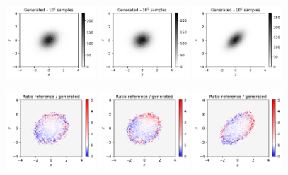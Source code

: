 \documentclass[twocolumn,preprintnumbers,superscriptaddress]{revtex4-2}
\begin{document}
\begin{figure}
  \includegraphics[width=0.3\textwidth]{plots/3Dgaussian_posdef/1-2_FAKE_100k.pdf}%
  \includegraphics[width=0.3\textwidth]{plots/3Dgaussian_posdef/2-3_FAKE_100k.pdf}%
  \includegraphics[width=0.3\textwidth]{plots/3Dgaussian_posdef/3-1_FAKE_100k.pdf}

  \includegraphics[width=0.3\textwidth]{plots/3Dgaussian_posdef/1-2_RATIO_100k.pdf}%
  \includegraphics[width=0.3\textwidth]{plots/3Dgaussian_posdef/2-3_RATIO_100k.pdf}%
  \includegraphics[width=0.3\textwidth]{plots/3Dgaussian_posdef/3-1_RATIO_100k.pdf}


\end{figure}
\end{document}
